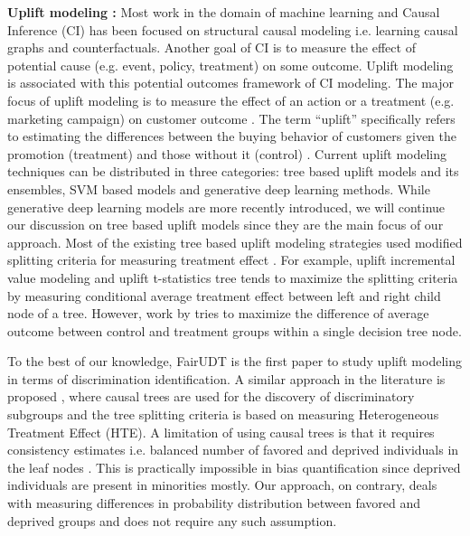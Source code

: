\textbf{Uplift modeling :} 
Most work in the domain of machine learning and Causal Inference (CI) has been focused on structural causal modeling i.e. learning causal graphs and counterfactuals. Another goal of CI is to measure the effect of potential cause (e.g. event, policy, treatment) on some outcome. Uplift modeling is associated with this potential outcomes framework of CI modeling.
The major focus of uplift modeling is to measure the effect of an action or a treatment (e.g. marketing campaign) on customer outcome \citep{gutierrez2017causal}. The term “uplift” specifically refers to estimating the differences between the buying behavior of customers given the promotion (treatment) and those without it (control) \citep{ jaskowski2012uplift}. Current uplift modeling techniques can be distributed in three categories: tree based uplift models and its ensembles, SVM based models and generative deep learning methods. While generative deep learning models are more recently introduced, we will continue our discussion on tree based uplift models since they are the main focus of our approach. Most of the existing tree based uplift modeling strategies used modified splitting criteria for measuring treatment effect \citep{gaoutboost2023}. For example, uplift incremental value modeling \citep{hansotia2002incremental} and uplift t-statistics tree \citep{Su2009subgroup} tends to maximize the splitting criteria by measuring conditional average treatment effect between left and right child node of a tree. However, work by \citet{rzepakowski2010decision} tries to maximize the difference of average outcome between control and treatment groups within a single decision tree node.

To the best of our knowledge, FairUDT is the first paper to study uplift modeling in terms of discrimination identification. A similar approach in the literature is proposed \citep{he2020inherent}, where causal trees are used for the discovery of discriminatory subgroups and the tree splitting criteria is based on measuring Heterogeneous Treatment Effect (HTE). A limitation of using causal trees is that it requires consistency estimates i.e. balanced number of favored and deprived individuals in the leaf nodes \citep{Athey7353}. This is practically impossible in bias quantification since deprived individuals are present in minorities mostly. Our approach, on contrary, deals with measuring differences in probability distribution between favored and deprived groups and does not require any such assumption.

